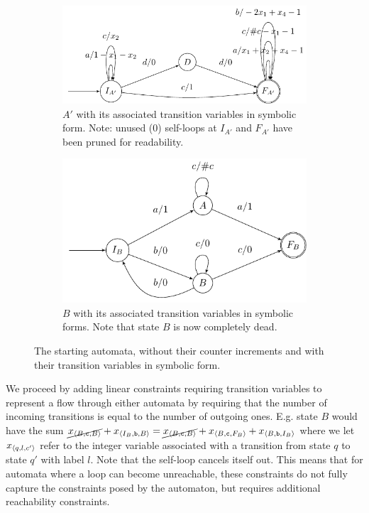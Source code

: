 \begin{figure}[h]
    \centering 
  \begin{subfigure}[b]{0.5\textwidth}
    \centering
    \includegraphics[scale=\autscale]{a_annotated}
    \caption{ $A'$ with its associated transition variables in symbolic form.
    Note: unused ($0$) self-loops at $I_{A'}$ and $F_{A'}$ have been pruned for
    readability.}\label{fig:aut_a_annotated}
  \end{subfigure}
  \begin{subfigure}[b]{0.5\textwidth}
    \centering
    \includegraphics[scale=\autscale]{b_annotated}
    \caption{$B$ with its associated transition variables in symbolic forms.
    Note that state $B$ is now completely dead.}\label{fig:aut_b_annotated}
  \end{subfigure}
  \caption{The starting automata, without their counter increments and with
  their transition variables in symbolic form.}\label{fig:propagated}
\end{figure}


We proceed by adding linear constraints requiring transition variables to
represent a flow through either automata by requiring that the number of
incoming transitions is equal to the number of outgoing ones. E.g. state $B$
would have the sum $\cancel{x_{\left\langle B, \texttt{c}, B\right\rangle}} + x_{\left\langle I_B,
\texttt{b}, B\right\rangle} = \cancel{x_{\left\langle B, \texttt{c}, B\right\rangle}}  + x_{\left\langle B, \texttt{c},
F_B\right\rangle} + x_{\left\langle B, \texttt{b}, I_B\right\rangle}$ where we let $x_{\left\langle q, l, c'\right\rangle}$ refer
to the integer variable associated with a transition from state $q$ to state
$q'$ with label $l$. Note that the self-loop cancels itself out. This means that
for automata where a loop can become unreachable, these constraints do not fully
capture the constraints posed by the automaton, but requires additional
reachability constraints.

